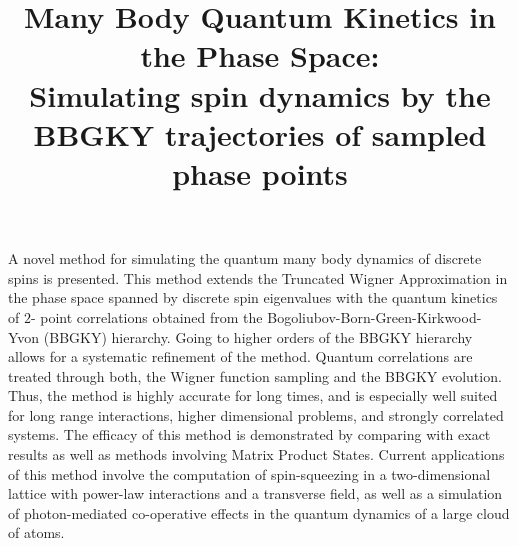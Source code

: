 \documentclass[extendedabs]{bmvc2k}
\begin{document}
\title{Many Body Quantum Kinetics in the Phase Space:\\
Simulating spin dynamics by the BBGKY trajectories of sampled phase points}
 
 
\maketitle




\noindent
A novel method for simulating the quantum many body dynamics of discrete spins is presented. This method extends the Truncated Wigner Approximation in the phase space
spanned by discrete spin eigenvalues with the quantum kinetics of $2$- point correlations obtained from the Bogoliubov-Born-Green-Kirkwood-Yvon (BBGKY) hierarchy. Going to higher orders of the BBGKY hierarchy allows for a systematic refinement of the method. Quantum correlations are treated through both, the Wigner function sampling and the BBGKY evolution. Thus, the method is highly accurate for long times, and is especially well suited for long range interactions, higher dimensional problems, and strongly correlated systems. The efficacy of this method is demonstrated by comparing with exact results as well as methods involving Matrix Product States. Current applications of this method involve the  computation of spin-squeezing in a two-dimensional lattice with power-law interactions and a transverse field, as well as a simulation of  photon-mediated co-operative effects in the quantum dynamics of a large cloud of atoms.
\end{document}

